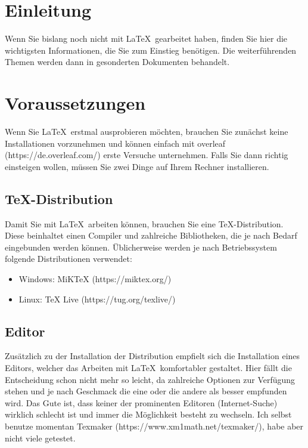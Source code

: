 \documentclass[12pt,a4paper]{scrartcl}
\begin{document}
%
\section{Einleitung}
Wenn Sie bislang noch nicht mit \LaTeX\, gearbeitet haben, finden Sie hier die wichtigsten Informationen, die Sie zum Einstieg benötigen.
Die weiterführenden Themen werden dann in gesonderten Dokumenten behandelt. 
%
\section{Voraussetzungen}
Wenn Sie \LaTeX\, erstmal ausprobieren möchten, brauchen Sie zunächst keine Installationen vorzunehmen und können einfach mit overleaf (https://de.overleaf.com/) erste Versuche unternehmen.
Falls Sie dann richtig einsteigen wollen, müssen Sie zwei Dinge auf Ihrem Rechner installieren.
%
\subsection{TeX-Distribution}
Damit Sie mit \LaTeX\, arbeiten können, brauchen Sie eine TeX-Distribution.
Diese beinhaltet einen Compiler und zahlreiche Bibliotheken, die je nach Bedarf eingebunden werden können.
Üblicherweise werden je nach Betriebssystem folgende Distributionen verwendet:
%
\begin{itemize}
\item Windows: MiKTeX (https://miktex.org/)
\item Linux: TeX Live (https://tug.org/texlive/)
\end{itemize}
%
\subsection{Editor}
Zusätzlich zu der Installation der Distribution empfielt sich die Installation eines Editors, welcher das Arbeiten mit \LaTeX\, komfortabler gestaltet. 
Hier fällt die Entscheidung schon nicht mehr so leicht, da zahlreiche Optionen zur Verfügung stehen und je nach Geschmack die eine oder die andere als besser empfunden wird.
Das Gute ist, dass keiner der prominenten Editoren (Internet-Suche) wirklich schlecht ist und immer die Möglichkeit besteht zu wechseln.
Ich selbst benutze momentan Texmaker (https://www.xm1math.net/texmaker/), habe aber nicht viele getestet.
%
\end{document}
